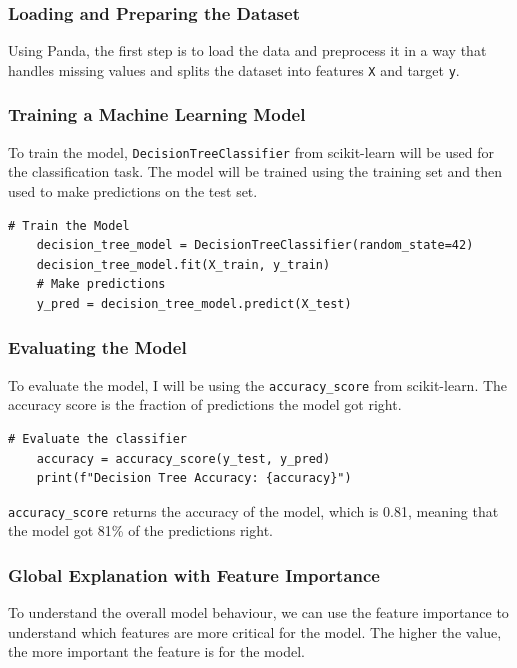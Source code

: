 \documentclass[10pt,journal,compsoc]{IEEEtran}
\begin{document}
\subsubsection{Loading and Preparing the Dataset}
Using Panda, the first step is to load the data and preprocess it in a way that handles missing values and splits the dataset into features \texttt{X} and target \texttt{y}.

\subsubsection{Training a Machine Learning Model}
To train the model, \texttt{DecisionTreeClassifier} from scikit-learn will be used for the classification task. The model will be trained using the training set and then used to make predictions on the test set.

\begin{lstlisting}[caption=Training a Decision Tree Classifier]
    # Train the Model
    decision_tree_model = DecisionTreeClassifier(random_state=42)
    decision_tree_model.fit(X_train, y_train)
    # Make predictions
    y_pred = decision_tree_model.predict(X_test)
\end{lstlisting}

\subsubsection{Evaluating the Model}
To evaluate the model, I will be using the \texttt{accuracy\_score} from scikit-learn. The accuracy score is the fraction of predictions the model got right.

\begin{lstlisting}[caption=Evaluating the Model]
    # Evaluate the classifier
    accuracy = accuracy_score(y_test, y_pred)
    print(f"Decision Tree Accuracy: {accuracy}")
\end{lstlisting}

\texttt{accuracy\_score} returns the accuracy of the model, which is 0.81, meaning that the model got 81\% of the predictions right.

\subsubsection{Global Explanation with Feature Importance
}

To understand the overall model behaviour, we can use the feature importance to understand which features are more critical for the model. The higher the value, the more important the feature is for the model.
\end{document}
